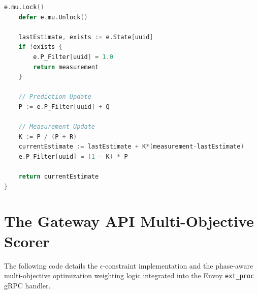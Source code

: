 \documentclass[12pt,a4paper,oneside]{report}
\begin{document}
\begin{lstlisting}[language=Go]
    e.mu.Lock()
    defer e.mu.Unlock()

    lastEstimate, exists := e.State[uuid]
    if !exists {
        e.P_Filter[uuid] = 1.0
        return measurement
    }

    // Prediction Update
    P := e.P_Filter[uuid] + Q

    // Measurement Update
    K := P / (P + R)
    currentEstimate := lastEstimate + K*(measurement-lastEstimate)
    e.P_Filter[uuid] = (1 - K) * P

    return currentEstimate
}
\end{lstlisting}

\section{The Gateway API Multi-Objective Scorer}
The following code details the \(\epsilon\)-constraint implementation and the phase-aware multi-objective optimization weighting logic integrated into the Envoy \texttt{ext\_proc} gRPC handler.
\end{document}
